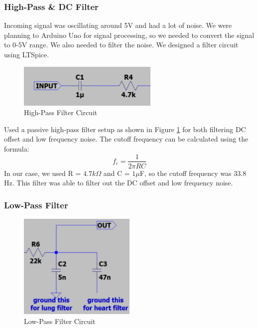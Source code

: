 \subsubsection{High-Pass \& DC Filter}
Incoming signal was oscillating around 5V and had a lot of noise. We were planning to Arduino Uno for signal processing, so we needed to convert the signal to 0-5V range. We also needed to filter the noise. We designed a filter circuit using LTSpice.
\begin{figure}[h]
	\centering
	\includegraphics[width=0.6\textwidth]{assets/high-pass.png}
	\caption{High-Pass Filter Circuit}
	\label{fig:hp_filter_circuit}
\end{figure}

Used a passive high-pass filter setup as shown in Figure \ref{fig:hp_filter_circuit} for both filtering DC offset and low frequency noise. The cutoff frequency can be calculated using the formula:
\begin{equation}\label{eq:filter_cutoff}
	f_c = \frac{1}{2\pi RC}
\end{equation}
In our case, we used R = $4.7k\Omega$ and C = $1\mu$F, so the cutoff frequency was $33.8$Hz. This filter was able to filter out the DC offset and low frequency noise.

\subsubsection{Low-Pass Filter}

\begin{figure}[h]
	\centering
	\includegraphics[width=0.5\textwidth]{assets/low-pass.png}
	\caption{Low-Pass Filter Circuit}
	\label{fig:lp_filter_circuit}
\end{figure}

